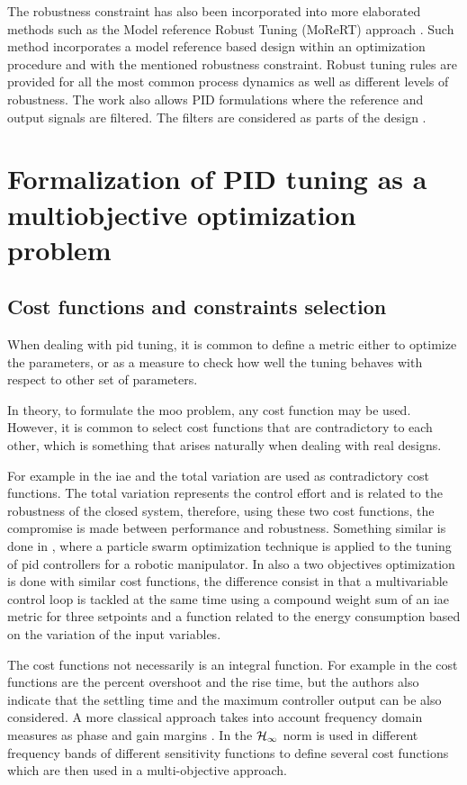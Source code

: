 The robustness constraint has also been incorporated into more elaborated  methods such as the Model reference Robust Tuning (MoReRT) approach \citep{alfarojopc22}. Such method incorporates a model reference based design within an optimization procedure and with the mentioned robustness constraint. Robust tuning rules are provided for all the most common process dynamics as well as different levels of robustness. The work also allows PID formulations where the reference and output signals are filtered. The filters are considered as parts of the design \citep{alfaroiechr2013}.
%
%
\section{Formalization of PID tuning as a multiobjective optimization problem}
\label{sec:FormPIDMOOP}
\subsection{Cost functions and constraints selection}
\label{sec:CostFunSelec}
When dealing with \gls{pid} tuning, it is common to define a metric either to optimize the parameters, or as a measure to check how well the tuning behaves with respect to other set of parameters.

In theory, to formulate the \gls{moo} problem, any cost function may be used. However, it is common to select cost functions that are contradictory to each other, which is something that arises naturally when dealing with real designs.

For example in \citet{SabinaSanchez2017} the \gls{iae} and the total variation are used as contradictory cost functions. The total variation represents the control effort and is related to the robustness of the closed system, therefore, using these two cost functions, the compromise is made between performance and robustness. Something similar is done in \citet{Pierezan2014}, where a particle swarm optimization technique is applied to the tuning of \gls{pid} controllers for a robotic manipulator. In \citet{Zhou2018} also a two objectives optimization is done with similar cost functions, the difference consist in that a multivariable control loop is tackled at the same time using a compound weight sum of an \gls{iae} metric for three setpoints and a function related to the energy consumption based on the variation of the input variables.

The cost functions not necessarily is an integral function. For example in \citet{Abbas1995} the cost functions are the percent overshoot  and the rise time, but the authors also indicate that the settling time and the maximum controller output can be also considered. A more classical approach takes into account frequency domain measures as phase and gain margins \citep{astromhagglun84,hoetal95}. In \citet{Huang2008a} the $\cal{ H}_\infty$ norm is used in different frequency bands of different sensitivity functions to define several cost functions which are then used in a multi-objective approach.

